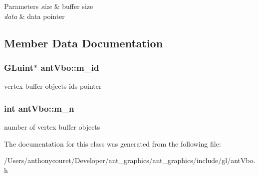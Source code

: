 \begin{DoxyParams}{Parameters}
{\em size} & buffer size \\
\hline
{\em data} & data pointer \\
\hline
\end{DoxyParams}


\subsection{Member Data Documentation}
\hypertarget{classant_vbo_ad9d6ae592ea4f03caf48fd98ce5660c0}{
\subsubsection[{m\+\_\+id}]{\setlength{\rightskip}{0pt plus 5cm}G\+Luint$\ast$ ant\+Vbo\+::m\+\_\+id\hspace{0.3cm}{\ttfamily [private]}}}\label{classant_vbo_ad9d6ae592ea4f03caf48fd98ce5660c0}
vertex buffer objects ids pointer \hypertarget{classant_vbo_aa470c365da54128248ff3cf82a13bb1d}{
\subsubsection[{m\+\_\+n}]{\setlength{\rightskip}{0pt plus 5cm}int ant\+Vbo\+::m\+\_\+n\hspace{0.3cm}{\ttfamily [private]}}}\label{classant_vbo_aa470c365da54128248ff3cf82a13bb1d}
number of vertex buffer objects 

The documentation for this class was generated from the following file\+:\begin{DoxyCompactItemize}
\item 
/\+Users/anthonycouret/\+Developer/ant\+\_\+graphics/ant\+\_\+graphics/include/gl/ant\+Vbo.\+h\end{DoxyCompactItemize}
